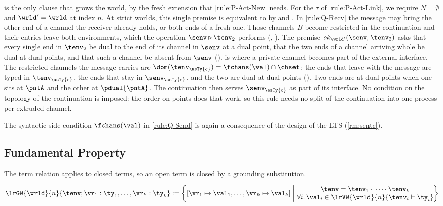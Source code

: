  is the only clause that grows the world, by the fresh
extension that \ref{rule:P-Act-New} needs.
For the $\tau$ of \ref{rule:P-Act-Link}, we require $N = \emptyset$
and $\wrld' = \wrld$ at index $n$.
At strict worlds, this single premise is equivalent to 
by  and .
In \ref{rule:Q-Recv} the message may bring the other end of a channel
the receiver already holds, or both ends of a fresh one. Those channels
$B$ become restricted in the continuation and their entries leave both
environments, which the operation $\senv \mathbin{\triangleright} \tenv_2$
performs (, ). The premise
$\mathit{ok}_{\wrld'}(\senv, \tenv_2)$ asks that every single end in
$\tenv_2$ be dual to the end of its channel in $\senv$ at a dual
point, that the two ends of a channel arriving whole be dual at dual
points, and that such a channel be absent from $\senv$
().
 is where a private channel becomes part of the
external interface. The restricted channels the message carries are
$\dom(\tenv_{\asTy{e}}) = \fchans(\val) \cap \chset$; the ends that
leave with the message are typed in $\tenv_{\asTy{e}}$, the ends that
stay in $\senv_{\asTy{e}}$, and the two are dual at dual points
(). Two ends are at dual points when one sits at
$\pntA$ and the other at $\pdual{\pntA}$. The continuation then serves
$\senv_{\asTy{e}}$ as part of its interface. No condition on the
topology of the continuation is imposed: the order on points does that
work, so this rule needs no split of the continuation into one process
per extruded channel.

The syntactic side condition $\fchans(\val)$ in \ref{rule:Q-Send} is
again a consequence of the design of the LTS (\cref{rm:sentc}).

\subsection{Fundamental Property}
\label{sec:fundamental}

The term relation applies to closed terms, so an open term is closed by
a grounding substitution.

\begin{definition}
\label{def:grounding}
  \[
    \lrGW{\wrld}{n}{\tenv ; \vr_1 : \ty_1, \dots, \vr_k : \ty_k} :=
      \left\{
        [\vr_1 \mapsto \val_1,\dots,\vr_k \mapsto \val_k] \;\middle|\;
          \begin{matrix}
          \tenv = \tenv_1 \cdot {} \dots \cdot \tenv_k
            \\
          \forall i.\,
            \val_i \in \lrVW{\wrld}{n}{\tenv_i \types \ty_i}
          \end{matrix}
      \right\}
  \]
\end{definition}

